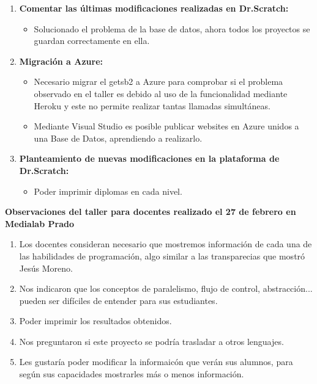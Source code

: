 \documentclass[a4paper,12pt]{letter}
\begin{document}
\begin{letter}
\begin{enumerate}
    
    \item {\textbf {Comentar las últimas modificaciones realizadas en Dr.Scratch:}}
    \begin{itemize}
        \item {Solucionado el problema de la base de datos, ahora todos los proyectos se guardan correctamente en ella.}
    \end{itemize}

    \item{\textbf {Migración a Azure:}}
    \begin{itemize}
        \item {Necesario migrar el getsb2 a Azure para comprobar si el problema observado en el taller es debido al uso de la funcionalidad mediante Heroku y este no permite realizar tantas llamadas simultáneas.}
        \item {Mediante Visual Studio es posible publicar websites en Azure unidos a una Base de Datos, aprendiendo a realizarlo.}
    \end{itemize}
	\item{\textbf {Planteamiento de nuevas modificaciones en la plataforma de Dr.Scratch:}}
    \begin{itemize}
        \item {Poder imprimir diplomas en cada nivel.}
    \end{itemize}

\end{enumerate}

\vspace{0.75cm}
\textbf{{\LARGE Observaciones del taller para docentes realizado el 27 de febrero en Medialab Prado}}
\vspace{0.5cm}

\begin{enumerate}
    \item {Los docentes consideran necesario que mostremos información de cada una de las habilidades de programación, algo similar a las transparecias que mostró Jesús Moreno.}
    \item {Nos indicaron que los conceptos de paralelismo, flujo de control, abstracción... pueden ser difíciles de entender para sus estudiantes.}
    \item {Poder imprimir los resultados obtenidos.}
    \item {Nos preguntaron si este proyecto se podría trasladar a otros lenguajes.}
    \item {Les gustaría poder modificar la informaicón que verán sus alumnos, para según sus capacidades mostrarles más o menos información.}
\end{enumerate}


\end{letter}
\end{document}
